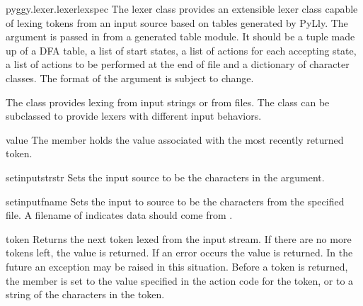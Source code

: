 \begin{classdesc}{pyggy.lexer.lexer}{lexspec}
The lexer class provides an extensible lexer class capable of lexing
tokens from an input source based on tables generated by PyLly.
The  argument is passed in from a generated table module.
It should be a tuple made up of a DFA table, a list of start states,
a list of actions for each accepting state, a list of actions to
be performed at the end of file and a dictionary of character classes.
The format of the  argument is subject to change.

The  class provides lexing from input strings or from
files.  The class can be subclassed to provide lexers with different
input behaviors.

\begin{memberdesc}{value}
The  member holds the value associated with the most
recently returned token.
\end{memberdesc}

\begin{methoddesc}{setinputstr}{str}
Sets the input source to be the characters in the  argument.
\end{methoddesc}

\begin{methoddesc}{setinput}{fname}
Sets the input to source to be the characters from the specified file.
A filename of \file{-} indicates data should come from .
\end{methoddesc}

\begin{methoddesc}{token}{}
Returns the next token lexed from the input stream.  If there are no
more tokens left, the value  is returned.  If an error occurs
the value  is returned.  In the future an
exception may be raised in this situation.  Before a token is returned,
the  member is set to the value specified in the action
code for the token, or to a string of the characters in the token.
\end{methoddesc}

\end{classdesc}



\section{}

